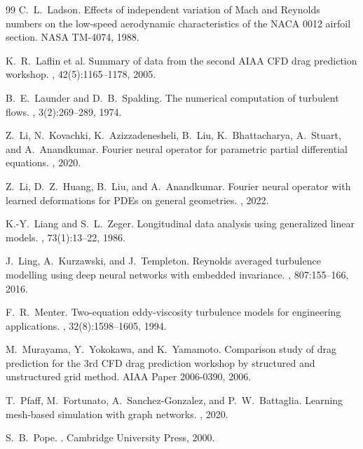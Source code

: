 \documentclass[11pt,a4paper]{article}
\theoremstyle{definition}
\theoremstyle{remark}
\begin{document}
\begin{thebibliography}{99}
C.~L.~Ladson.
\newblock Effects of independent variation of Mach and Reynolds numbers on the low-speed aerodynamic characteristics of the NACA 0012 airfoil section.
\newblock NASA TM-4074, 1988.

K.~R.~Laflin et al.
\newblock Summary of data from the second AIAA CFD drag prediction workshop.
, 42(5):1165--1178, 2005.

B.~E.~Launder and D.~B.~Spalding.
\newblock The numerical computation of turbulent flows.
, 3(2):269--289, 1974.

Z.~Li, N.~Kovachki, K.~Azizzadenesheli, B.~Liu, K.~Bhattacharya, A.~Stuart, and A.~Anandkumar.
\newblock Fourier neural operator for parametric partial differential equations.
, 2020.

Z.~Li, D.~Z.~Huang, B.~Liu, and A.~Anandkumar.
\newblock Fourier neural operator with learned deformations for PDEs on general geometries.
, 2022.

K.-Y.~Liang and S.~L.~Zeger.
\newblock Longitudinal data analysis using generalized linear models.
, 73(1):13--22, 1986.

J.~Ling, A.~Kurzawski, and J.~Templeton.
\newblock Reynolds averaged turbulence modelling using deep neural networks with embedded invariance.
, 807:155--166, 2016.

F.~R.~Menter.
\newblock Two-equation eddy-viscosity turbulence models for engineering applications.
, 32(8):1598--1605, 1994.

M.~Murayama, Y.~Yokokawa, and K.~Yamamoto.
\newblock Comparison study of drag prediction for the 3rd CFD drag prediction workshop by structured and unstructured grid method.
\newblock AIAA Paper 2006-0390, 2006.

T.~Pfaff, M.~Fortunato, A.~Sanchez-Gonzalez, and P.~W.~Battaglia.
\newblock Learning mesh-based simulation with graph networks.
, 2020.

S.~B.~Pope.
.
\newblock Cambridge University Press, 2000.


\end{thebibliography}
\end{document}
